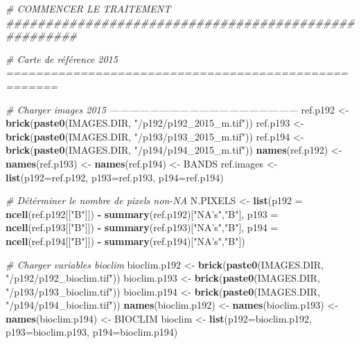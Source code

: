 \documentclass[a4paper, notitlepage, 12pt, krantz2]{krantz}
\newenvironment{Shaded}{\begin{snugshade}}{\end{snugshade}}
\newcommand{\CommentTok}[1]{\textcolor[rgb]{0.56,0.35,0.01}{\textit{#1}}}
\newcommand{\DataTypeTok}[1]{\textcolor[rgb]{0.13,0.29,0.53}{#1}}
\newcommand{\KeywordTok}[1]{\textcolor[rgb]{0.13,0.29,0.53}{\textbf{#1}}}
\newcommand{\NormalTok}[1]{#1}
\newcommand{\OperatorTok}[1]{\textcolor[rgb]{0.81,0.36,0.00}{\textbf{#1}}}
\newcommand{\StringTok}[1]{\textcolor[rgb]{0.31,0.60,0.02}{#1}}
\begin{document}
\begin{Shaded}
\begin{Highlighting}[]
\CommentTok{# COMMENCER LE TRAITEMENT #####################################################}

\CommentTok{# Carte de référence 2015 =====================================================}

\CommentTok{# Charger images 2015 ---------------------------------------------------------}
\NormalTok{ref.p192 <-}\StringTok{ }\KeywordTok{brick}\NormalTok{(}\KeywordTok{paste0}\NormalTok{(IMAGES.DIR, }\StringTok{"/p192/p192_2015_m.tif"}\NormalTok{))}
\NormalTok{ref.p193 <-}\StringTok{ }\KeywordTok{brick}\NormalTok{(}\KeywordTok{paste0}\NormalTok{(IMAGES.DIR, }\StringTok{"/p193/p193_2015_m.tif"}\NormalTok{))}
\NormalTok{ref.p194 <-}\StringTok{ }\KeywordTok{brick}\NormalTok{(}\KeywordTok{paste0}\NormalTok{(IMAGES.DIR, }\StringTok{"/p194/p194_2015_m.tif"}\NormalTok{))}
\KeywordTok{names}\NormalTok{(ref.p192) <-}\StringTok{ }\KeywordTok{names}\NormalTok{(ref.p193) <-}\StringTok{ }\KeywordTok{names}\NormalTok{(ref.p194) <-}\StringTok{ }\NormalTok{BANDS}
\NormalTok{ref.images <-}\StringTok{ }\KeywordTok{list}\NormalTok{(}\DataTypeTok{p192=}\NormalTok{ref.p192, }\DataTypeTok{p193=}\NormalTok{ref.p193, }\DataTypeTok{p194=}\NormalTok{ref.p194)}

\CommentTok{# Détérminer le nombre de pixels non-NA}
\NormalTok{N.PIXELS <-}\StringTok{ }\KeywordTok{list}\NormalTok{(}\DataTypeTok{p192 =} \KeywordTok{ncell}\NormalTok{(ref.p192[[}\StringTok{"B"}\NormalTok{]]) }\OperatorTok{-}\StringTok{ }\KeywordTok{summary}\NormalTok{(ref.p192)[}\StringTok{"NA's"}\NormalTok{,}\StringTok{"B"}\NormalTok{],}
                 \DataTypeTok{p193 =} \KeywordTok{ncell}\NormalTok{(ref.p193[[}\StringTok{"B"}\NormalTok{]]) }\OperatorTok{-}\StringTok{ }\KeywordTok{summary}\NormalTok{(ref.p193)[}\StringTok{"NA's"}\NormalTok{,}\StringTok{"B"}\NormalTok{],}
                 \DataTypeTok{p194 =} \KeywordTok{ncell}\NormalTok{(ref.p194[[}\StringTok{"B"}\NormalTok{]]) }\OperatorTok{-}\StringTok{ }\KeywordTok{summary}\NormalTok{(ref.p194)[}\StringTok{"NA's"}\NormalTok{,}\StringTok{"B"}\NormalTok{])}

\CommentTok{# Charger variables bioclim}
\NormalTok{bioclim.p192 <-}\StringTok{ }\KeywordTok{brick}\NormalTok{(}\KeywordTok{paste0}\NormalTok{(IMAGES.DIR, }\StringTok{"/p192/p192_bioclim.tif"}\NormalTok{))}
\NormalTok{bioclim.p193 <-}\StringTok{ }\KeywordTok{brick}\NormalTok{(}\KeywordTok{paste0}\NormalTok{(IMAGES.DIR, }\StringTok{"/p193/p193_bioclim.tif"}\NormalTok{))}
\NormalTok{bioclim.p194 <-}\StringTok{ }\KeywordTok{brick}\NormalTok{(}\KeywordTok{paste0}\NormalTok{(IMAGES.DIR, }\StringTok{"/p194/p194_bioclim.tif"}\NormalTok{))}
\KeywordTok{names}\NormalTok{(bioclim.p192) <-}\StringTok{ }\KeywordTok{names}\NormalTok{(bioclim.p193) <-}\StringTok{ }\KeywordTok{names}\NormalTok{(bioclim.p194) <-}\StringTok{ }\NormalTok{BIOCLIM}
\NormalTok{bioclim <-}\StringTok{ }\KeywordTok{list}\NormalTok{(}\DataTypeTok{p192=}\NormalTok{bioclim.p192, }\DataTypeTok{p193=}\NormalTok{bioclim.p193, }\DataTypeTok{p194=}\NormalTok{bioclim.p194)}



\end{Highlighting}
\end{Shaded}
\end{document}
